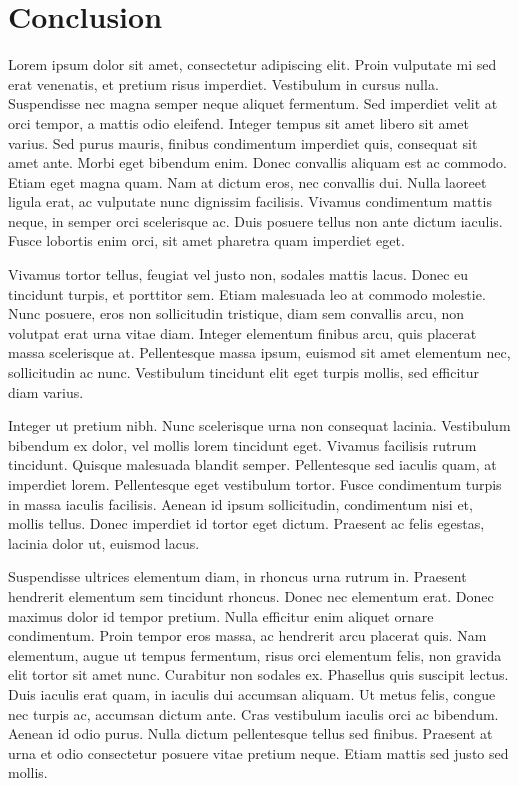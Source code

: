 \section{Conclusion}

Lorem ipsum dolor sit amet, consectetur adipiscing elit. Proin vulputate mi sed erat venenatis, et pretium risus imperdiet. Vestibulum in cursus nulla. Suspendisse nec magna semper neque aliquet fermentum. Sed imperdiet velit at orci tempor, a mattis odio eleifend. Integer tempus sit amet libero sit amet varius. Sed purus mauris, finibus condimentum imperdiet quis, consequat sit amet ante. Morbi eget bibendum enim. Donec convallis aliquam est ac commodo. Etiam eget magna quam. Nam at dictum eros, nec convallis dui. Nulla laoreet ligula erat, ac vulputate nunc dignissim facilisis. Vivamus condimentum mattis neque, in semper orci scelerisque ac. Duis posuere tellus non ante dictum iaculis. Fusce lobortis enim orci, sit amet pharetra quam imperdiet eget.

Vivamus tortor tellus, feugiat vel justo non, sodales mattis lacus. Donec eu tincidunt turpis, et porttitor sem. Etiam malesuada leo at commodo molestie. Nunc posuere, eros non sollicitudin tristique, diam sem convallis arcu, non volutpat erat urna vitae diam. Integer elementum finibus arcu, quis placerat massa scelerisque at. Pellentesque massa ipsum, euismod sit amet elementum nec, sollicitudin ac nunc. Vestibulum tincidunt elit eget turpis mollis, sed efficitur diam varius.

Integer ut pretium nibh. Nunc scelerisque urna non consequat lacinia. Vestibulum bibendum ex dolor, vel mollis lorem tincidunt eget. Vivamus facilisis rutrum tincidunt. Quisque malesuada blandit semper. Pellentesque sed iaculis quam, at imperdiet lorem. Pellentesque eget vestibulum tortor. Fusce condimentum turpis in massa iaculis facilisis. Aenean id ipsum sollicitudin, condimentum nisi et, mollis tellus. Donec imperdiet id tortor eget dictum. Praesent ac felis egestas, lacinia dolor ut, euismod lacus.

Suspendisse ultrices elementum diam, in rhoncus urna rutrum in. Praesent hendrerit elementum sem tincidunt rhoncus. Donec nec elementum erat. Donec maximus dolor id tempor pretium. Nulla efficitur enim aliquet ornare condimentum. Proin tempor eros massa, ac hendrerit arcu placerat quis. Nam elementum, augue ut tempus fermentum, risus orci elementum felis, non gravida elit tortor sit amet nunc. Curabitur non sodales ex. Phasellus quis suscipit lectus. Duis iaculis erat quam, in iaculis dui accumsan aliquam. Ut metus felis, congue nec turpis ac, accumsan dictum ante. Cras vestibulum iaculis orci ac bibendum. Aenean id odio purus. Nulla dictum pellentesque tellus sed finibus. Praesent at urna et odio consectetur posuere vitae pretium neque. Etiam mattis sed justo sed mollis.

